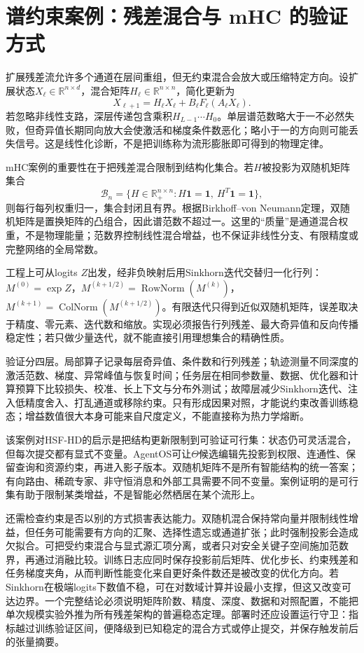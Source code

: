 \section{谱约束案例：残差混合与 mHC 的验证方式}
\label{sec:case_study_mhc}

扩展残差流允许多个通道在层间重组，但无约束混合会放大或压缩特定方向。设扩展状态$X_\ell\in\mathbb R^{n\times d}$，混合矩阵$H_\ell\in\mathbb R^{n\times n}$，简化更新为
\begin{equation}
X_{\ell+1}=H_\ell X_\ell+B_\ell F_\ell(A_\ell X_\ell).
\end{equation}
若忽略非线性支路，深层传递包含乘积$H_{L-1}\cdots H_0$。单层谱范数略大于一不必然失败，但奇异值长期同向放大会使激活和梯度条件数恶化；略小于一的方向则可能丢失信号。这是线性化诊断，不是把训练称为流形膨胀即可得到的物理定律。

mHC案例的重要性在于把残差混合限制到结构化集合。若$H$被投影为双随机矩阵集合
\begin{equation}
\mathcal B_n=\{H\in\mathbb R_+^{n\times n}:H\mathbf1=\mathbf1,\ H^T\mathbf1=\mathbf1\},
\end{equation}
则每行每列权重归一，集合封闭且有界。根据Birkhoff--von Neumann定理，双随机矩阵是置换矩阵的凸组合，因此谱范数不超过一。这里的“质量”是通道混合权重，不是物理能量；范数界控制线性混合增益，也不保证非线性分支、有限精度或完整网络的全局常数。

工程上可从logits $Z$出发，经非负映射后用Sinkhorn迭代交替归一化行列：$M^{(0)}=\exp Z$，$M^{(k+1/2)}=\operatorname{RowNorm}(M^{(k)})$，$M^{(k+1)}=\operatorname{ColNorm}(M^{(k+1/2)})$。有限迭代只得到近似双随机矩阵，误差取决于精度、零元素、迭代数和缩放。实现必须报告行列残差、最大奇异值和反向传播稳定性；若只做少量迭代，就不能直接引用理想集合的精确性质。

验证分四层。局部算子记录每层奇异值、条件数和行列残差；轨迹测量不同深度的激活范数、梯度、异常峰值与恢复时间；任务层在相同参数量、数据、优化器和计算预算下比较损失、校准、长上下文与分布外测试；故障层减少Sinkhorn迭代、注入低精度舍入、打乱通道或移除约束。只有形成因果对照，才能说约束改善训练稳态；增益数值很大本身可能来自尺度定义，不能直接称为热力学熔断。

该案例对HSF-HD的启示是把结构更新限制到可验证可行集：状态仍可灵活混合，但每次提交都有显式不变量。AgentOS可让$\Theta$候选编辑先投影到权限、连通性、保留查询和资源约束，再进入影子版本。双随机矩阵不是所有智能结构的统一答案；有向路由、稀疏专家、非守恒消息和外部工具需要不同不变量。案例证明的是可行集有助于限制某类增益，不是智能必然栖居在某个流形上。

还需检查约束是否以别的方式损害表达能力。双随机混合保持常向量并限制线性增益，但任务可能需要有方向的汇聚、选择性遗忘或通道扩张；此时强制投影会造成欠拟合。可把受约束混合与显式源汇项分离，或者只对安全关键子空间施加范数界，再通过消融比较。训练日志应同时保存投影前后矩阵、优化步长、约束残差和任务梯度夹角，从而判断性能变化来自更好条件数还是被改变的优化方向。若Sinkhorn在极端logits下数值不稳，可在对数域计算并设最小支撑，但这又改变可达边界。一个完整结论必须说明矩阵阶数、精度、深度、数据和对照配置，不能把单次规模实验外推为所有残差架构的普遍稳态定理。部署时还应设置运行守卫：指标越过训练验证区间，便降级到已知稳定的混合方式或停止提交，并保存触发前后的张量摘要。

